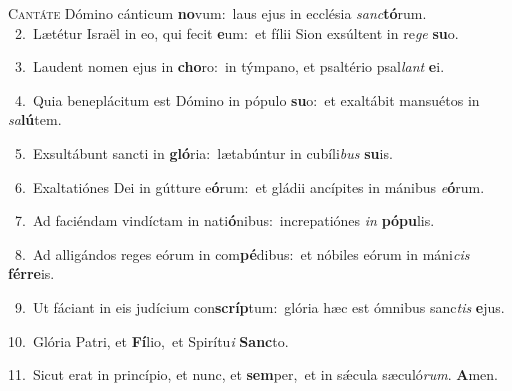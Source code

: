\lettrine{\initial\textcolor{\initialcolor}{C}}{antáte} Dómino cánticum \textbf{no}\-vum:~\star laus ejus in ecclésia \textit{sanc}\-\textbf{tó}rum.\\
{\numbfont\textcolor{\numbcolor}{~2.}}~Lætétur Israël in eo, qui fecit \textbf{e}\-um:~\star et fílii Sion exsúltent in re\textit{ge} \textbf{su}\-o.\par
{\numbfont\textcolor{\numbcolor}{~3.}}~Laudent nomen ejus in \textbf{cho}\-ro:~\star in týmpano, et psaltério psal\textit{lant} \textbf{e}\-i.\par
{\numbfont\textcolor{\numbcolor}{~4.}}~Quia beneplácitum est Dómino in pópulo \textbf{su}\-o:~\star et exaltábit mansuétos in \textit{sa}\-\textbf{lú}tem.\par
{\numbfont\textcolor{\numbcolor}{~5.}}~Exsultábunt sancti in \textbf{gló}\-ria:~\star lætabúntur in cubíli\textit{bus} \textbf{su}\-is.\par
{\numbfont\textcolor{\numbcolor}{~6.}}~Exaltatiónes Dei in gútture e\-\textbf{ó}\-rum:~\star et gládii ancípites in mánibus \textit{e}\-\textbf{ó}rum.\par
{\numbfont\textcolor{\numbcolor}{~7.}}~Ad faciéndam vindíctam in nati\-\textbf{ó}\-nibus:~\star increpatiónes \textit{in} \textbf{pó}\-\textbf{pu}lis.\par
{\numbfont\textcolor{\numbcolor}{~8.}}~Ad alligándos reges eórum in com\-\textbf{pé}\-dibus:~\star et nóbiles eórum in máni\textit{cis} \textbf{fér}\-\textbf{re}is.\par
{\numbfont\textcolor{\numbcolor}{~9.}}~Ut fáciant in eis judícium con\-\textbf{scríp}\-tum:~\star glória hæc est ómnibus sanc\textit{tis} \textbf{e}\-jus.\par
{\numbfont\textcolor{\numbcolor}{10.}}~Glória Patri, et \textbf{Fí}\-lio,~\star et Spirítu\textit{i} \textbf{Sanc}\-to.\par
{\numbfont\textcolor{\numbcolor}{11.}}~Sicut erat in princípio, et nunc, et \textbf{sem}\-per,~\star et in sǽcula sæculó\-\textit{rum}\-. \textbf{A}\-men.\par

